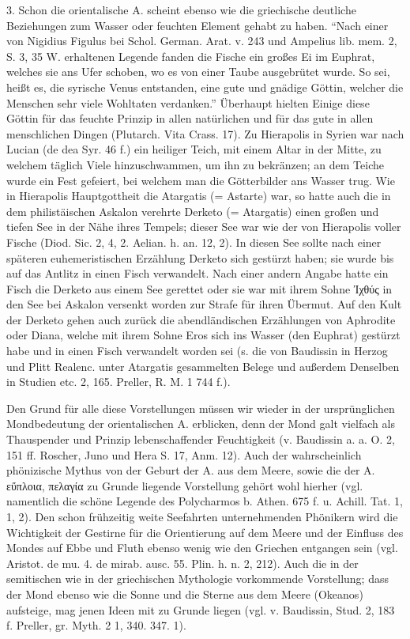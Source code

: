\documentclass[a4paper, 11pt, oneside]{article}
\begin{document}
3. Schon die orientalische A. scheint ebenso wie die griechische deutliche Beziehungen zum Wasser oder feuchten Element gehabt zu haben. "`Nach einer von Nigidius Figulus bei Schol. German. Arat. v. 243 und Ampelius lib. mem. 2, S. 3, 35 W. erhaltenen Legende fanden die Fische ein großes Ei im Euphrat, welches sie ans Ufer schoben, wo es von einer Taube ausgebrütet wurde. So sei, heißt es, die syrische Venus entstanden, eine gute und gnädige Göttin, welcher die Menschen sehr viele Wohltaten verdanken."' Überhaupt hielten Einige diese Göttin für das feuchte Prinzip in allen natürlichen und für das gute in allen menschlichen Dingen (Plutarch. Vita Crass. 17). Zu Hierapolis in Syrien war nach Lucian (de dea Syr. 46 f.) ein heiliger Teich, mit einem Altar in der Mitte, zu welchem täglich Viele hinzuschwammen, um ihn zu bekränzen; an dem Teiche wurde ein Fest gefeiert, bei welchem man die Götterbilder ans Wasser trug. Wie in Hierapolis Hauptgottheit die Atargatis (= Astarte) war, so hatte auch die in dem philistäischen Askalon verehrte Derketo (= Atargatis) einen großen und tiefen See in der Nähe ihres Tempels; dieser See war wie der von Hierapolis voller Fische (Diod. Sic. 2, 4, 2. Aelian. h. an. 12, 2). In diesen See sollte nach einer späteren euhemeristischen Erzählung Derketo sich gestürzt haben; sie wurde bis auf das Antlitz in einen Fisch verwandelt. Nach einer andern Angabe hatte ein Fisch die Derketo aus einem See gerettet oder sie war mit ihrem Sohne Ἰχθύς in den See bei Askalon versenkt worden zur Strafe für ihren Übermut. Auf den Kult der Derketo gehen auch zurück die abendländischen Erzählungen von Aphrodite oder Diana, welche mit ihrem Sohne Eros sich ins Wasser (den Euphrat) gestürzt habe und in einen Fisch verwandelt worden sei (s. die von Baudissin in Herzog und Plitt Realenc. unter Atargatis gesammelten Belege und außerdem Denselben in Studien etc. 2, 165. Preller, R. M. 1 744 f.).

Den Grund für alle diese Vorstellungen müssen wir wieder in der ursprünglichen Mondbedeutung der orientalischen A. erblicken, denn der Mond galt vielfach als Thauspender und Prinzip lebenschaffender Feuchtigkeit (v. Baudissin a. a. O. 2, 151 ff. Roscher, Juno und Hera S. 17, Anm. 12). Auch der wahrscheinlich phönizische Mythus von der Geburt der A. aus dem Meere, sowie die der A. εὔπλοια, πελαγία zu Grunde liegende Vorstellung gehört wohl hierher (vgl. namentlich die schöne Legende des Polycharmos b. Athen. 675 f. u. Achill. Tat. 1, 1, 2). Den schon frühzeitig weite Seefahrten unternehmenden Phönikern wird die Wichtigkeit der Gestirne für die Orientierung auf dem Meere und der Einfluss des Mondes auf Ebbe und Fluth ebenso wenig wie den Griechen entgangen sein (vgl. Aristot. de mu. 4. de mirab. ausc. 55. Plin. h. n. 2, 212). Auch die in der semitischen wie in der griechischen Mythologie vorkommende Vorstellung; dass der Mond ebenso wie die Sonne und die Sterne aus dem Meere (Okeanos) aufsteige, mag jenen Ideen mit zu Grunde liegen (vgl. v. Baudissin, Stud. 2, 183 f. Preller, gr. Myth. 2 1, 340. 347. 1).
\end{document}
